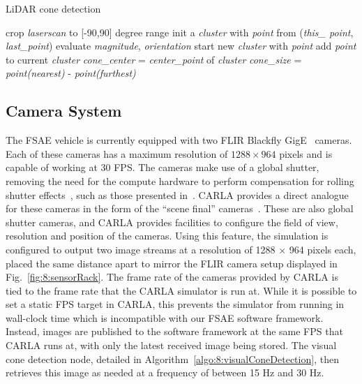 \begin{algorithm}[H] %
	\caption{LiDAR cone detection}\label{algo:8:lidarConeDetection}
	\begin{algorithmic}[1]
		\State crop \textit{laserscan} to [-90,90] degree range
		\State init a \textit{cluster} with \textit{point}
		\Else
		\State from (\textit{this\_ point}, \textit{last\_point})
		\State evaluate \textit{magnitude}, \textit{orientation}
		\State start new \textit{cluster} with \textit{point}
		\Else
		\State add \textit{point} to current \textit{cluster}
		\EndIf
		\EndIf
		\EndFor
		\State \textit{cone\_center} = \textit{center\_point} of \textit{cluster}
		\State \textit{cone\_size} = \textit{point(nearest)} - \textit{point(furthest)}
		\EndFor
		\EndProcedure
	\end{algorithmic}
\end{algorithm}

\subsection{Camera System} \label{subsec:8:cameraSystem}
The FSAE vehicle is currently equipped with two FLIR Blackfly GigE~\cite{flir_blackfly_nodate} cameras.
Each of these cameras has a maximum resolution of $1288 \times 964$ pixels and is capable of working at 30 FPS.
The cameras make use of a global shutter, removing the need for the compute hardware to perform compensation for rolling shutter effects~\cite{lauxtermann_comparison_2007}, such as those presented in~\cite{liang_analysis_2008}.
CARLA provides a direct analogue for these cameras in the form of the ``scene final'' cameras~\cite{carla_cameras_nodate}.
These are also global shutter cameras, and CARLA provides facilities to configure the field of view, resolution and position of the cameras.
Using this feature, the simulation is configured to output two image streams at a resolution of 1288 $\times$ 964 pixels each, placed the same distance apart to mirror the FLIR camera setup displayed in Fig.~\ref{fig:8:sensorRack}.
The frame rate of the cameras provided by CARLA is tied to the frame rate that the CARLA simulator is run at.
While it is possible to set a static FPS target in CARLA, this prevents the simulator from running in wall-clock time which is incompatible with our FSAE software framework.
Instead, images are published to the software framework at the same FPS that CARLA runs at, with only the latest received image being stored.
The visual cone detection node, detailed in Algorithm~\ref{algo:8:visualConeDetection}, then retrieves this image as needed at a frequency of between 15 Hz and 30 Hz.

